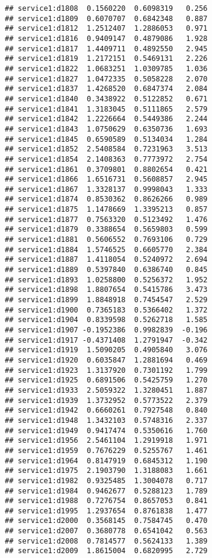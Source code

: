 \documentclass[
]{article}
\begin{document}
\begin{verbatim}
## service1:d1808  0.1560220  0.6098319   0.256
## service1:d1809  0.6070707  0.6842348   0.887
## service1:d1812  1.2512407  1.2886053   0.971
## service1:d1816  0.9409147  0.4879086   1.928
## service1:d1817  1.4409711  0.4892550   2.945
## service1:d1819  1.2172151  0.5469131   2.226
## service1:d1822  1.0683251  1.0309785   1.036
## service1:d1827  1.0472335  0.5058228   2.070
## service1:d1837  1.4268520  0.6847374   2.084
## service1:d1840  0.3438922  0.5122852   0.671
## service1:d1841  1.3183045  0.5111865   2.579
## service1:d1842  1.2226664  0.5449386   2.244
## service1:d1843  1.0750629  0.6350736   1.693
## service1:d1845  0.6590589  0.5134034   1.284
## service1:d1852  2.5408584  0.7231963   3.513
## service1:d1854  2.1408363  0.7773972   2.754
## service1:d1861  0.3709801  0.8802654   0.421
## service1:d1866  1.6516731  0.5608857   2.945
## service1:d1867  1.3328137  0.9998043   1.333
## service1:d1874  0.8530362  0.8626266   0.989
## service1:d1875  1.1478669  1.3395213   0.857
## service1:d1877  0.7563320  0.5123492   1.476
## service1:d1879  0.3388654  0.5659803   0.599
## service1:d1881  0.5606552  0.7693106   0.729
## service1:d1884  1.5746525  0.6605770   2.384
## service1:d1887  1.4118054  0.5240972   2.694
## service1:d1889  0.5397840  0.6386740   0.845
## service1:d1893  1.0258800  0.5256372   1.952
## service1:d1898  1.8807654  0.5415786   3.473
## service1:d1899  1.8848918  0.7454547   2.529
## service1:d1900  0.7365183  0.5366402   1.372
## service1:d1904  0.8339598  0.5262718   1.585
## service1:d1907 -0.1952386  0.9982839  -0.196
## service1:d1917 -0.4371408  1.2791947  -0.342
## service1:d1919  1.5090205  0.4905840   3.076
## service1:d1920  0.6035847  1.2881694   0.469
## service1:d1923  1.3137920  0.7301192   1.799
## service1:d1925  0.6891506  0.5425759   1.270
## service1:d1933  2.5059322  1.3280451   1.887
## service1:d1939  1.3732952  0.5773522   2.379
## service1:d1942  0.6660261  0.7927548   0.840
## service1:d1948  1.3432103  0.5748316   2.337
## service1:d1949  0.9417474  0.5350616   1.760
## service1:d1956  2.5461104  1.2919918   1.971
## service1:d1959  0.7676229  0.5255767   1.461
## service1:d1964  0.8147919  0.6845312   1.190
## service1:d1975  2.1903790  1.3188083   1.661
## service1:d1982  0.9325485  1.3004078   0.717
## service1:d1984  0.9462677  0.5288123   1.789
## service1:d1988  0.7276754  0.8657053   0.841
## service1:d1995  1.2937654  0.8761838   1.477
## service1:d2000  0.3568145  0.7584745   0.470
## service1:d2007  0.3680778  0.6541042   0.563
## service1:d2008  0.7814577  0.5624133   1.389
## service1:d2009  1.8615004  0.6820995   2.729

\end{verbatim}
\end{document}
